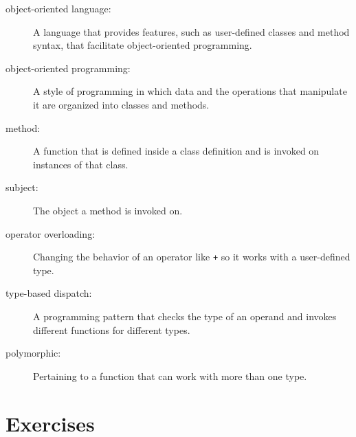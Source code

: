 \documentclass[10pt]{book}
\begin{document}
\begin{description}

\item[object-oriented language:] A language that provides features,
  such as user-defined classes and method syntax, that facilitate
  object-oriented programming.

\item[object-oriented programming:] A style of programming in which
data and the operations that manipulate it are organized into classes
and methods.

\item[method:] A function that is defined inside a class definition and
is invoked on instances of that class.

\item[subject:] The object a method is invoked on.

\item[operator overloading:] Changing the behavior of an operator like
{\tt +} so it works with a user-defined type.

\item[type-based dispatch:] A programming pattern that checks the type
of an operand and invokes different functions for different types.

\item[polymorphic:] Pertaining to a function that can work with more
  than one type.  


\end{description}

\section{Exercises}
\end{document}
